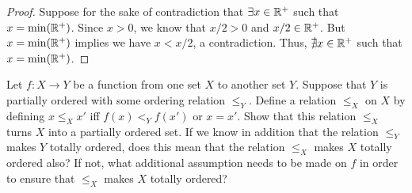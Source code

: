 \begin{proof}
  Suppose for the sake of contradiction that \(\exists x \in \mathbb{R}^+\) such that \(x = \min(\mathbb{R}^+)\).
  Since \(x > 0\), we know that \(x / 2 > 0\) and \(x / 2 \in \mathbb{R}^+\).
  But \(x = \min(\mathbb{R}^+)\) implies we have \(x < x / 2\), a contradiction.
  Thus, \(\nexists x \in \mathbb{R}^+\) such that \(x = \min(\mathbb{R}^+)\).
\end{proof}

\begin{ex}\label{i:ex:8.5.5}
  Let \(f : X \to Y\) be a function from one set \(X\) to another set \(Y\).
  Suppose that \(Y\) is partially ordered with some ordering relation \(\leq_Y\).
  Define a relation \(\leq_X\) on \(X\) by defining \(x \leq_X x'\) iff \(f(x) <_Y f(x')\) or \(x = x'\).
  Show that this relation \(\leq_X\) turns \(X\) into a partially ordered set.
  If we know in addition that the relation \(\leq_Y\) makes \(Y\) totally ordered, does this mean that the relation \(\leq_X\) makes \(X\) totally ordered also?
  If not, what additional assumption needs to be made on \(f\) in order to ensure that \(\leq_X\) makes \(X\) totally ordered?
\end{ex}

